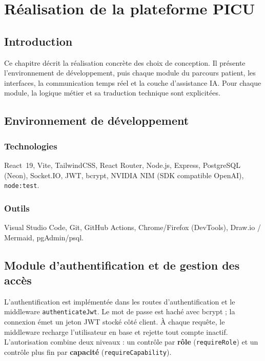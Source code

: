 \chapter{Réalisation de la plateforme PICU}

\section{Introduction}

Ce chapitre décrit la réalisation concrète des choix de conception. Il présente l'environnement de développement, puis chaque module du parcours patient, les interfaces, la communication temps réel et la couche d'assistance IA. Pour chaque module, la logique métier et sa traduction technique sont explicitées.

\section{Environnement de développement}

\subsection{Technologies}

React~19, Vite, TailwindCSS, React Router, Node.js, Express, PostgreSQL (Neon), Socket.IO, JWT, bcrypt, NVIDIA NIM (SDK compatible OpenAI), \texttt{node:test}.

\subsection{Outils}

Visual Studio Code, Git, GitHub Actions, Chrome/Firefox (DevTools), Draw.io / Mermaid, pgAdmin/psql.

\section{Module d'authentification et de gestion des accès}

L'authentification est implémentée dans les routes d'authentification et le middleware \texttt{authenticateJwt}. Le mot de passe est haché avec bcrypt ; la connexion émet un jeton JWT stocké côté client. À chaque requête, le middleware recharge l'utilisateur en base et rejette tout compte inactif. L'autorisation combine deux niveaux : un contrôle par \textbf{rôle} (\texttt{requireRole}) et un contrôle plus fin par \textbf{capacité} (\texttt{requireCapability}).

